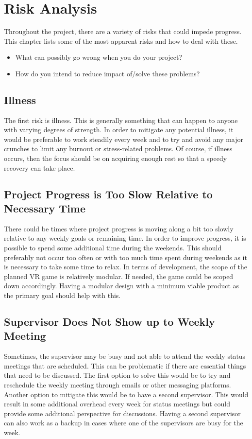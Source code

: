 \chapter{Risk Analysis}\label{chap:risk}
Throughout the project, there are a variety of risks that could impede progress. This chapter lists some of the most apparent risks and how to deal with these.

\begin{itemize}
\item What can possibly go wrong when you do your project?
\item How do you intend to reduce impact of/solve these problems?
\end{itemize}
\fi

\section{Illness}
The first risk is illness. This is generally something that can happen to anyone with varying degrees of strength. In order to mitigate any potential illness, it would be preferable to work steadily every week and to try and avoid any major crunches to limit any burnout or stress-related problems. Of course, if illness occurs, then the focus should be on acquiring enough rest so that a speedy recovery can take place. 

\section{Project Progress is Too Slow Relative to Necessary Time}
There could be times where project progress is moving along a bit too slowly relative to any weekly goals or remaining time. In order to improve progress, it is possible to spend some additional time during the weekends. This should preferably not occur too often or with too much time spent during weekends as it is necessary to take some time to relax. In terms of development, the scope of the planned VR game is relatively modular. If needed, the game could be scoped down accordingly. Having a modular design with a minimum viable product as the primary goal should help with this. 

\section{Supervisor Does Not Show up to Weekly Meeting}
Sometimes, the supervisor may be busy and not able to attend the weekly status meetings that are scheduled. This can be problematic if there are essential things that need to be discussed. The first option to solve this would be to try and reschedule the weekly meeting through emails or other messaging platforms. Another option to mitigate this would be to have a second supervisor. This would result in some additional overhead every week for status meetings but could provide some additional perspective for discussions. Having a second supervisor can also work as a backup in cases where one of the supervisors are busy for the week. 

